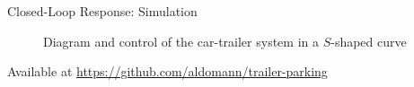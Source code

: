 \begin{frame}{Closed-Loop Response: Simulation}
\begin{figure}[H]
	\centering
	\hspace{0.5cm}%
	\caption{Diagram and control of the car-trailer system in a $S$-shaped curve}
\end{figure}

\footnotesize{Available at \url{https://github.com/aldomann/trailer-parking}}

\end{frame}


